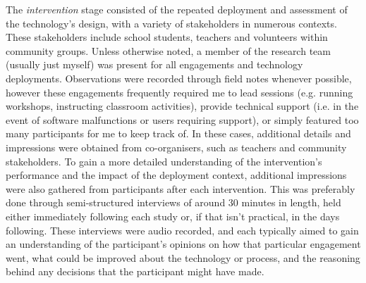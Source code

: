 The \textit{intervention} stage consisted of the repeated deployment and assessment of the technology's design, with a variety of stakeholders in numerous contexts. These stakeholders include school students, teachers and volunteers within community groups. Unless otherwise noted, a member of the research team (usually just myself) was present for all engagements and technology deployments. Observations were recorded through field notes whenever possible, however these engagements frequently required me to lead sessions (e.g. running workshops, instructing classroom activities), provide technical support (i.e. in the event of software malfunctions or users requiring support), or simply featured too many participants for me to keep track of. In these cases, additional details and impressions were obtained from co-organisers, such as teachers and community stakeholders. To gain a more detailed understanding of the intervention's performance and the impact of the deployment context, additional impressions were also gathered from participants after each intervention. This was preferably done through semi-structured interviews of around 30 minutes in length, held either immediately following each study or, if that isn't practical, in the days following. These interviews were audio recorded, and each typically aimed to gain an understanding of the participant's opinions on how that particular engagement went, what could be improved about the technology or process, and the reasoning behind any decisions that the participant might have made.

